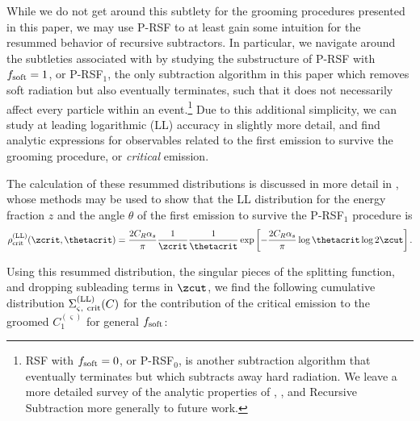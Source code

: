 \documentclass[letterpaper,11pt]{article}
\begin{document}
While we do not get around this subtlety for the \PIRANHA{} grooming procedures presented in this paper, we may use P-RSF to at least gain some intuition for the resummed behavior of recursive subtractors.
%
In particular, we navigate around the subtleties associated with \PIRANHA{} by studying the substructure of P-RSF with \(f_{\rm soft} = 1\), or P-RSF\(_{1}\), the only subtraction algorithm in this paper which removes soft radiation but also eventually terminates, such that it does not necessarily affect every particle within an event.\footnote{
RSF with \(f_{\rm soft} = 0\), or P-RSF\(_{0}\), is another subtraction algorithm that eventually terminates but which subtracts away hard radiation.
%
We leave a more detailed survey of the analytic properties of , , and Recursive Subtraction more generally to future work.
}
%
Due to this additional simplicity, we can study  at leading logarithmic (LL) accuracy in slightly more detail, and find analytic expressions for observables related to the first emission to survive the grooming procedure, or \textit{critical} emission.

The calculation of these resummed distributions is discussed in more detail in , whose methods may be used to show that the LL distribution for the energy fraction \(z\) and the angle \(\theta\) of the first emission to survive the P-RSF\(_1\) procedure is
%
\begin{equation}
    \rho^{\rm(LL)}_{\rm crit}(\zcrit, \thetacrit)
    =
    \frac{2 C_R \alpha_s}{\pi}
    \frac{1}{\zcrit}\frac{1}{\thetacrit}
    \exp\left[-\frac{2 C_R \alpha_s}{\pi}
    \log\thetacrit
    \log 2 \zcut
    \right]
    .
\end{equation}

Using this resummed distribution, the singular pieces of the splitting function, and dropping subleading terms in \(\zcut\), we find the following cumulative distribution \(\Sigma^{\rm(LL)}_{\varsigma,~{\rm crit}}(C)\) for the contribution of the critical emission to the groomed \(C_1^{(\varsigma)}\)  for general \(f_{\rm soft}\):


\end{document}
